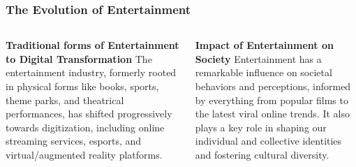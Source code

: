 \documentclass[5pt]{beamer}
\begin{document}
\begin{frame}
\frametitle{The Evolution of Entertainment}
\begin{columns}
\begin{column}{0.45\textwidth}
\begin{block}{\textbf{Traditional forms of Entertainment to Digital Transformation}}
The entertainment industry, formerly rooted in physical forms like books, sports, theme parks, and theatrical performances, has shifted progressively towards digitization, including online streaming services, esports, and virtual/augmented reality platforms.
\end{block}
\end{column}
\begin{column}{0.45\textwidth}
\begin{block}{\textbf{Impact of Entertainment on Society}}
Entertainment has a remarkable influence on societal behaviors and perceptions, informed by everything from popular films to the latest viral online trends. It also plays a key role in shaping our individual and collective identities and fostering cultural diversity.
\end{block}
\end{column}
\end{columns}
\end{frame}
\end{document}
